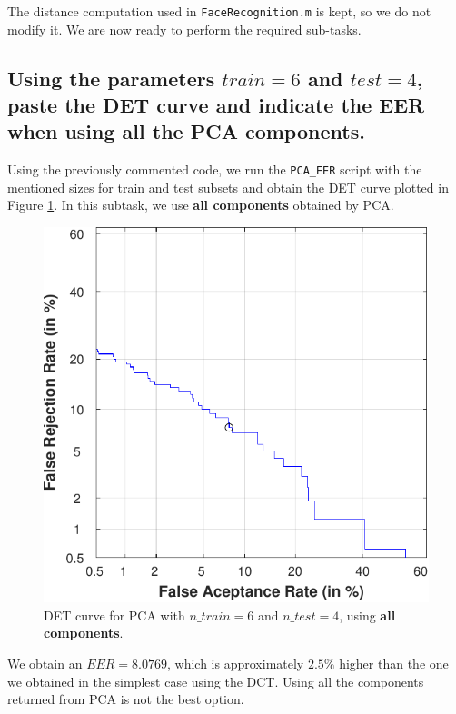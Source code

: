 \documentclass[a4paper]{article}
\def\inline{\lstinline[basicstyle=\ttfamily,keywordstyle={}]}
\begin{document}
The distance computation used in \inline{FaceRecognition.m} is kept, so we do not modify it. We are now ready to perform the required sub-tasks.

\subsection{ Using the parameters \(train = 6\) and \(test = 4\), paste the DET curve and indicate the EER when using all the PCA components.}


Using the previously commented code, we run the \inline{PCA_EER} script with the mentioned sizes for train and test subsets and obtain the DET curve plotted in Figure \ref{fig:ex2a}. In this subtask, we use \textbf{all components} obtained by PCA.

\begin{figure}[H]
  \centering
  \includegraphics[scale=0.7]{Figures/PCA-1-EER}
    \caption{DET curve for PCA with \(n\_train = 6\) and \(n\_test = 4\), using \textbf{all components}.}
    \label{fig:ex2a}
\end{figure}

We obtain an \(EER = 8.0769\), which is approximately \(2.5 \%\) higher than the one we obtained in the simplest case using the DCT. Using all the components returned from PCA is not the best option.
\end{document}
